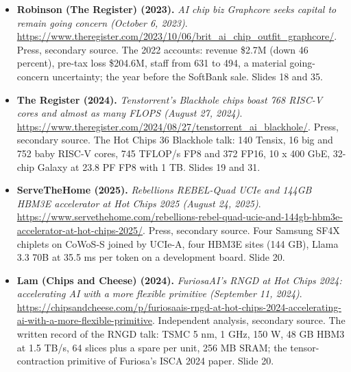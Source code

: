 \documentclass[11pt,letterpaper]{article}
\begin{document}
\begin{itemize}[leftmargin=1.2em,itemsep=3pt]
\item \textbf{Robinson (The Register) (2023).} \textit{AI chip biz Graphcore seeks capital to remain going concern (October 6, 2023)}. \url{https://www.theregister.com/2023/10/06/brit_ai_chip_outfit_graphcore/}. Press, secondary source. The 2022 accounts: revenue \$2.7M (down 46 percent), pre-tax loss \$204.6M, staff from 631 to 494, a material going-concern uncertainty; the year before the SoftBank sale. Slides 18 and 35.
\item \textbf{The Register (2024).} \textit{Tenstorrent's Blackhole chips boast 768 RISC-V cores and almost as many FLOPS (August 27, 2024)}. \url{https://www.theregister.com/2024/08/27/tenstorrent_ai_blackhole/}. Press, secondary source. The Hot Chips 36 Blackhole talk: 140 Tensix, 16 big and 752 baby RISC-V cores, 745 TFLOP/s FP8 and 372 FP16, 10 x 400 GbE, 32-chip Galaxy at 23.8 PF FP8 with 1 TB. Slides 19 and 31.
\item \textbf{ServeTheHome (2025).} \textit{Rebellions REBEL-Quad UCIe and 144GB HBM3E accelerator at Hot Chips 2025 (August 24, 2025)}. \url{https://www.servethehome.com/rebellions-rebel-quad-ucie-and-144gb-hbm3e-accelerator-at-hot-chips-2025/}. Press, secondary source. Four Samsung SF4X chiplets on CoWoS-S joined by UCIe-A, four HBM3E sites (144 GB), Llama 3.3 70B at 35.5 ms per token on a development board. Slide 20.
\item \textbf{Lam (Chips and Cheese) (2024).} \textit{FuriosaAI's RNGD at Hot Chips 2024: accelerating AI with a more flexible primitive (September 11, 2024)}. \url{https://chipsandcheese.com/p/furiosaais-rngd-at-hot-chips-2024-accelerating-ai-with-a-more-flexible-primitive}. Independent analysis, secondary source. The written record of the RNGD talk: TSMC 5 nm, 1 GHz, 150 W, 48 GB HBM3 at 1.5 TB/s, 64 slices plus a spare per unit, 256 MB SRAM; the tensor-contraction primitive of Furiosa's ISCA 2024 paper. Slide 20.
\end{itemize}
\end{document}
